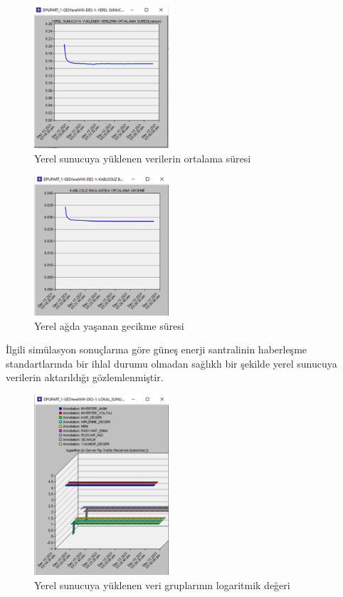 \begin{figure}[htbp]
\centerline{\includegraphics[width=5cm]{Resim/sekil4-16.png}}
\caption{Yerel sunucuya yüklenen verilerin ortalama süresi}
\label{fig:4-17}
\end{figure}


\begin{figure}[htbp]
\centerline{\includegraphics[width=5cm]{Resim/sekil4-17.png}}
\caption{Yerel ağda yaşanan gecikme süresi}
\label{fig:4-18}
\end{figure}

İlgili simülasyon sonuçlarına göre güneş enerji santralinin haberleşme standartlarında bir ihlal durumu olmadan sağlıklı bir şekilde yerel sunucuya verilerin aktarıldığı gözlemlenmiştir.

\begin{figure}[htbp]
\centerline{\includegraphics[width=5cm]{Resim/Sekil4-18.png}}
\caption{Yerel sunucuya yüklenen veri gruplarının logaritmik değeri}
\label{fig:4-19}
\end{figure}

